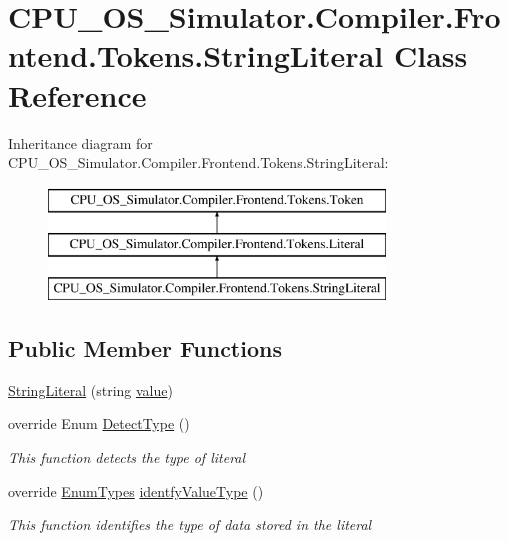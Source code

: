 \hypertarget{class_c_p_u___o_s___simulator_1_1_compiler_1_1_frontend_1_1_tokens_1_1_string_literal}{}\section{C\+P\+U\+\_\+\+O\+S\+\_\+\+Simulator.\+Compiler.\+Frontend.\+Tokens.\+String\+Literal Class Reference}
\label{class_c_p_u___o_s___simulator_1_1_compiler_1_1_frontend_1_1_tokens_1_1_string_literal}
Inheritance diagram for C\+P\+U\+\_\+\+O\+S\+\_\+\+Simulator.\+Compiler.\+Frontend.\+Tokens.\+String\+Literal\+:\begin{figure}[H]
\begin{center}
\leavevmode
\includegraphics[height=3.000000cm]{class_c_p_u___o_s___simulator_1_1_compiler_1_1_frontend_1_1_tokens_1_1_string_literal}
\end{center}
\end{figure}
\subsection*{Public Member Functions}
\begin{DoxyCompactItemize}
\item 
\hyperlink{class_c_p_u___o_s___simulator_1_1_compiler_1_1_frontend_1_1_tokens_1_1_string_literal_a78bb388b6ac5a9cc067f39358162373c}{String\+Literal} (string \hyperlink{class_c_p_u___o_s___simulator_1_1_compiler_1_1_frontend_1_1_tokens_1_1_token_a5c05e12850ca18be8cbfdf7e2e263324}{value})
\item 
override Enum \hyperlink{class_c_p_u___o_s___simulator_1_1_compiler_1_1_frontend_1_1_tokens_1_1_string_literal_a55fe99257eeaeb6d73db4ff188de3f57}{Detect\+Type} ()
\begin{DoxyCompactList}\small\item\em This function detects the type of literal \end{DoxyCompactList}\item 
override \hyperlink{namespace_c_p_u___o_s___simulator_1_1_compiler_1_1_frontend_1_1_tokens_a7c0cc43763cc9d01c7d5af34d70b96ea}{Enum\+Types} \hyperlink{class_c_p_u___o_s___simulator_1_1_compiler_1_1_frontend_1_1_tokens_1_1_string_literal_ad4121c2eda9ab84f08bb0c51996c96cb}{identfy\+Value\+Type} ()
\begin{DoxyCompactList}\small\item\em This function identifies the type of data stored in the literal \end{DoxyCompactList}\end{DoxyCompactItemize}
